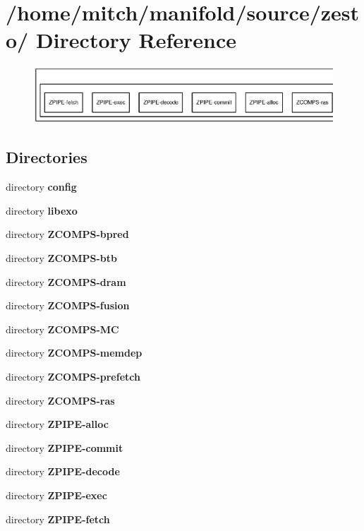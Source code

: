 \section{/home/mitch/manifold/source/zesto/ Directory Reference}
\label{dir_4516642e80adc9bf50ea604a2fbf2492}


\nopagebreak
\begin{figure}[H]
\begin{center}
\leavevmode
\includegraphics[width=420pt]{dir_4516642e80adc9bf50ea604a2fbf2492_dep}
\end{center}
\end{figure}
\subsection*{Directories}
\begin{CompactItemize}
\item 
directory {\bf config}
\item 
directory {\bf libexo}
\item 
directory {\bf ZCOMPS-bpred}
\item 
directory {\bf ZCOMPS-btb}
\item 
directory {\bf ZCOMPS-dram}
\item 
directory {\bf ZCOMPS-fusion}
\item 
directory {\bf ZCOMPS-MC}
\item 
directory {\bf ZCOMPS-memdep}
\item 
directory {\bf ZCOMPS-prefetch}
\item 
directory {\bf ZCOMPS-ras}
\item 
directory {\bf ZPIPE-alloc}
\item 
directory {\bf ZPIPE-commit}
\item 
directory {\bf ZPIPE-decode}
\item 
directory {\bf ZPIPE-exec}
\item 
directory {\bf ZPIPE-fetch}
\end{CompactItemize}
